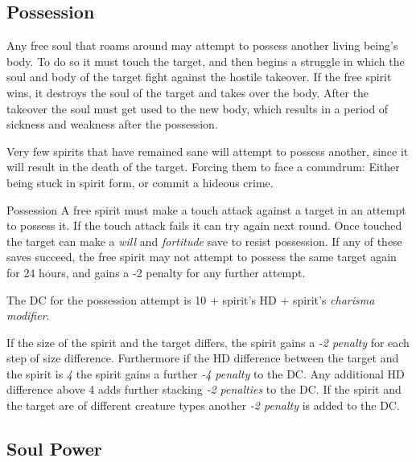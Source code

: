 \subsection{Possession}
\label{sec:Possession}

Any free soul that roams around may attempt to possess another living being's
body. To do so it must touch the target, and then begins a struggle in which
the soul and body of the target fight against the hostile takeover. If the
free spirit wins, it destroys the soul of the target and takes over the body.
After the takeover the soul must get used to the new body, which results in
a period of sickness and weakness after the possession.

Very few spirits that have remained sane will attempt to possess another, since
it will result in the death of the target. Forcing them to face a conundrum:
Either being stuck in spirit form, or commit a hideous crime.


\begin{35e}{Possession}
  A free spirit must make a touch attack against a target in an attempt to
  possess it. If the touch attack fails it can try again next round. Once
  touched the target can make a \emph{will} and \emph{fortitude} save to
  resist possession. If any of these saves succeed, the free spirit may not
  attempt to possess the same target again for 24 hours, and gains a -2
  penalty for any further attempt.

  The DC for the possession attempt is 10 +  spirit's HD +
  spirit's \emph{charisma modifier}.

  If the size of the spirit and the target differs, the spirit gains a
  \emph{-2 penalty} for each step of size difference. Furthermore if the
  HD difference between the target and the spirit is \emph{4} the spirit gains
  a further \emph{-4 penalty} to the DC. Any additional HD difference above
  4 adds further stacking \emph{-2 penalties} to the DC. If the spirit and
  the target are of different creature types another \emph{-2 penalty} is
  added to the DC.
\end{35e}

\subsection{Soul Power}
\label{sec:Soul Power}

